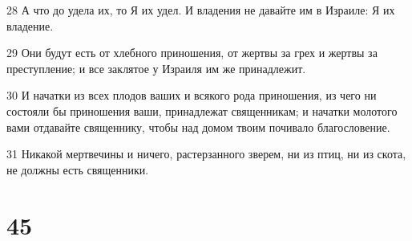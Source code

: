 \par 28 А что до удела их, то Я их удел. И владения не давайте им в Израиле: Я их владение.
\par 29 Они будут есть от хлебного приношения, от жертвы за грех и жертвы за преступление; и все заклятое у Израиля им же принадлежит.
\par 30 И начатки из всех плодов ваших и всякого рода приношения, из чего ни состояли бы приношения ваши, принадлежат священникам; и начатки молотого вами отдавайте священнику, чтобы над домом твоим почивало благословение.
\par 31 Никакой мертвечины и ничего, растерзанного зверем, ни из птиц, ни из скота, не должны есть священники.

\chapter{45}

